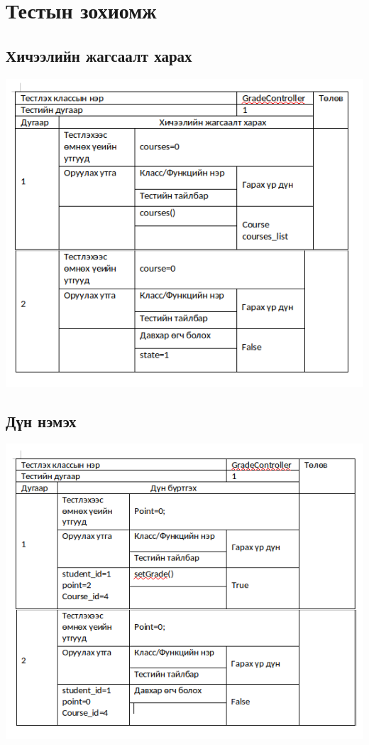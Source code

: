 \documentclass[
oneside, %
english, %
onehalfspacing, %
nolistspacing, %
headsepline, %
]{article} %
\begin{document}
     \section{Тестын зохиомж }
      \subsection{ Хичээлийн жагсаалт харах }
     \includegraphics[width=\textwidth]{hihi}
      \subsection{Дүн нэмэх}
     \includegraphics[width=\textwidth]{hihi1}
     
\end{document}
